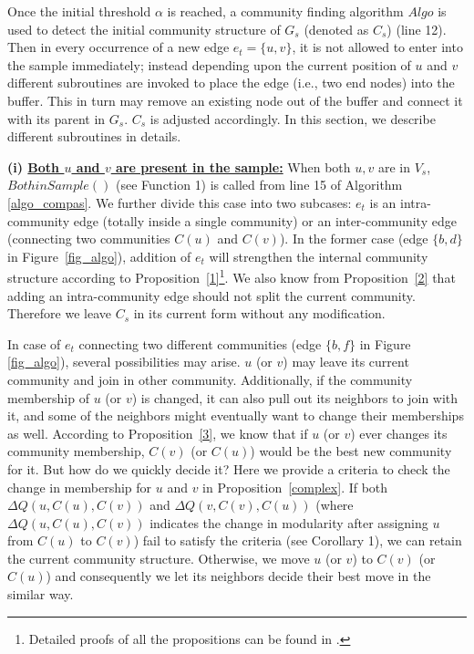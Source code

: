 Once the initial threshold $\alpha$ is reached, a community finding algorithm $Algo$ is used to detect the initial community structure of $G_s$ (denoted as $C_s$) (line 12). Then in every occurrence of a new edge $e_t=\{u,v\}$, it is not allowed to enter into the sample immediately; instead depending upon the current position of $u$ and $v$ different subroutines are invoked  
to place the edge (i.e., two end nodes) into the buffer. This in turn may remove an existing node out of the buffer and connect it with its parent in $G_s$. $C_s$ is adjusted accordingly. 
In this section, we describe different subroutines in details.





\noindent\textbf{(i) \underline{Both $u$ and $v$ are present in the sample:}} When both $u,v$ are in $V_s$, $BothinSample()$ (see Function 1) is called from line 15 of Algorithm \ref{algo_compas}.  We further divide this case into two subcases: $e_t$ is an intra-community edge (totally inside a single community) or an inter-community edge (connecting two communities $C(u)$ and $C(v)$). In the former case (edge $\{b,d\}$  in Figure~\ref{fig_algo}), addition of $e_t$ will strengthen the internal community structure according to Proposition~\ref{1}\footnote{Detailed proofs of all the propositions can be found in \cite{si}.}. We also know from Proposition~\ref{2} that adding an intra-community edge should not split the current community. Therefore we leave $C_s$ in its current form without any modification.

In case of $e_t$ connecting two different communities (edge $\{b,f\}$ in Figure \ref{fig_algo}), several possibilities may arise. $u$ (or $v$) may leave its current community and join in other community. Additionally, if the community membership of $u$ (or $v$) is changed, it can also pull out its neighbors to join with it, and some of the neighbors might eventually want to change their memberships as well. According to Proposition~\ref{3}, we know that if $u$ (or $v$) ever changes its community membership, $C(v)$ (or $C(u)$) would be the best new community for it. But how do we quickly decide it? Here we provide a criteria to check the change in membership for $u$ and $v$ in Proposition~\ref{complex}. If both $\Delta Q(u,C(u),C(v))$ and $\Delta Q(v,C(v),C(u))$ (where $\Delta Q(u,C(u),C(v))$ indicates the change in modularity after assigning $u$ from $C(u)$ to $C(v)$) fail to satisfy the criteria (see Corollary 1), we can retain the current community structure. Otherwise, we move $u$ (or $v$) to $C(v)$ (or $C(u)$) and consequently we let its neighbors decide their best move in the similar way. 



